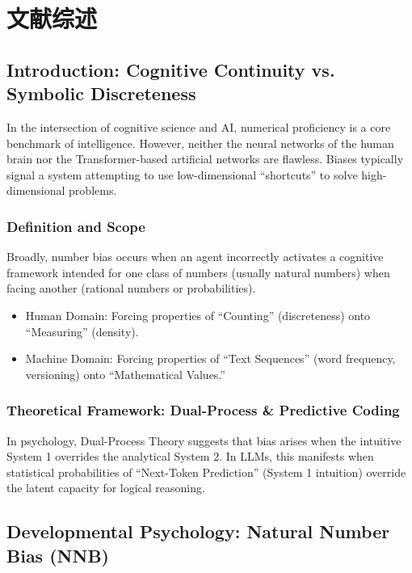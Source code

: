 \cleardoublepage
\newrefsection
\chapter{文献综述}

\section{Introduction: Cognitive Continuity vs. Symbolic Discreteness}

In the intersection of cognitive science and AI, numerical proficiency is a core benchmark of intelligence. However, neither the neural networks of the human brain nor the Transformer-based artificial networks are flawless. Biases typically signal a system attempting to use low-dimensional “shortcuts” to solve high-dimensional problems.

\subsection{Definition and Scope}

Broadly, number bias occurs when an agent incorrectly activates a cognitive framework intended for one class of numbers (usually natural numbers) when facing another (rational numbers or probabilities).

\begin{itemize}
    \item Human Domain: Forcing properties of “Counting” (discreteness) onto “Measuring” (density).
    \item Machine Domain: Forcing properties of “Text Sequences” (word frequency, versioning) onto “Mathematical Values.”
\end{itemize}

\subsection{Theoretical Framework: Dual-Process \& Predictive Coding}

In psychology, Dual-Process Theory suggests that bias arises when the intuitive System 1 overrides the analytical System 2\cite{alibali2015b}. In LLMs, this manifests when statistical probabilities of “Next-Token Prediction” (System 1 intuition) override the latent capacity for logical reasoning.

\section{Developmental Psychology: Natural Number Bias (NNB)}

